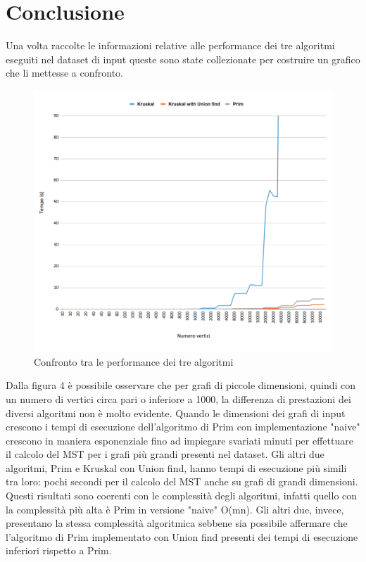 \section{Conclusione}
Una volta raccolte le informazioni relative alle performance dei tre algoritmi eseguiti nel dataset di input queste sono state collezionate per costruire un grafico che li mettesse a confronto.
\begin{figure}[H]
	\hspace{-1cm}\includegraphics[width=19cm]{Img/compare.png}
	\caption{Confronto tra le performance dei tre algoritmi}
\end{figure}
 Dalla figura 4 è possibile osservare che per grafi di piccole dimensioni, quindi con un numero di vertici circa pari o inferiore a 1000, la differenza di prestazioni dei diversi algoritmi non è molto evidente. Quando le dimensioni dei grafi di input crescono i tempi di esecuzione dell'algoritmo di Prim con implementazione "naive" crescono in maniera esponenziale fino ad impiegare svariati minuti per effettuare il calcolo del MST per i grafi più grandi presenti nel dataset. Gli altri due algoritmi, Prim e Kruskal con Union find, hanno tempi di esecuzione più simili tra loro: pochi secondi per il calcolo del MST anche su grafi di grandi dimensioni. \\
Questi risultati sono coerenti con le complessità degli algoritmi, infatti quello con la complessità più alta è Prim in versione "naive" O(mn). Gli altri due, invece, presentano la stessa complessità algoritmica sebbene sia possibile affermare che l'algoritmo di Prim implementato con Union find presenti dei tempi di esecuzione inferiori rispetto a Prim.
\pagebreak